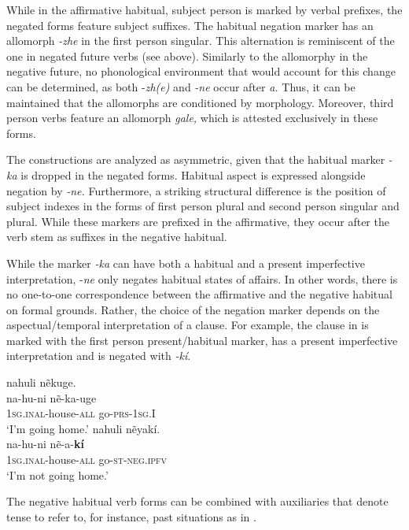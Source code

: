 \documentclass[output=paper,colorlinks,citecolor=brown]{langscibook}
\begin{document}
While in the affirmative habitual, subject person is marked by verbal prefixes, the negated forms feature subject suffixes. The habitual negation marker has an allomorph \textit{{}-zhe} in the first person singular. This alternation is reminiscent of the one in negated future verbs (see  above). Similarly to the allomorphy in the negative future, no phonological environment that would account for this change can be determined, as both -\textit{zh(e)} and \textit{{}-ne} occur after \textit{a.} Thus, it can be maintained that the allomorphs are conditioned by morphology. Moreover, third person verbs feature an allomorph \-\textit{gale,} which is attested exclusively in these forms.

The constructions are analyzed as asymmetric, given that the habitual marker \textit{\nobreakdash-ka} is dropped in the negated forms. Habitual aspect is expressed alongside negation by \textit{{}-ne.} Furthermore, a striking structural difference is the position of subject indexes in the forms of first person plural and second person singular and plural. While these markers are prefixed in the affirmative, they occur after the verb stem as suffixes in the negative habitual.

While the marker \textit{{}-ka} can have both a habitual and a present imperfective interpretation, -\textit{ne} only negates habitual states of affairs. In other words, there is no one-to-one correspondence between the affirmative and the negative habitual on formal grounds. Rather, the choice of the negation marker depends on the aspectual/temporal interpretation of a clause. For example, the clause in  is marked with the first person present/habitual marker, has a present imperfective interpretation and is negated with \textit{\nobreakdash-kí}.


\ea\label{ex:kog:15}
    \ea\label{ex:kog:15a}nahuli nẽkuge.\\
        \gll  na-hu-ni nẽ-ka-uge\\ 
              \textsc{1sg.inal{}-}house-\textsc{all} go-\textsc{prs-1sg.I}\\
        \glt ‘I'm going home.’
    \ex\label{ex:kog:15b}nahuli nẽyakí.\\
        \gll  na-hu-ni nẽ-a-\textbf{kí}\\
              \textsc{1sg.inal}\textsc{-}house-\textsc{all} go-\textsc{st-neg.ipfv}\\
        \glt ‘I'm not going home.’
    \z
\z 

The negative habitual verb forms can be combined with auxiliaries that denote tense to refer to, for instance, past situations as in . 
\end{document}
